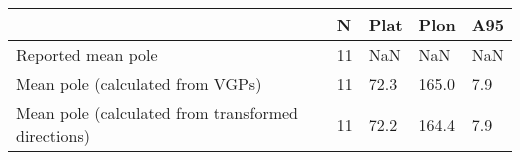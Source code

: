 \begin{tabular}{lllll}
\toprule
{} &   N &  Plat &   Plon &  A95 \\
\midrule
Reported mean pole                                 &  11 &   NaN &    NaN &  NaN \\
Mean pole (calculated from VGPs)                   &  11 &  72.3 &  165.0 &  7.9 \\
Mean pole (calculated from transformed directions) &  11 &  72.2 &  164.4 &  7.9 \\
\bottomrule
\end{tabular}
